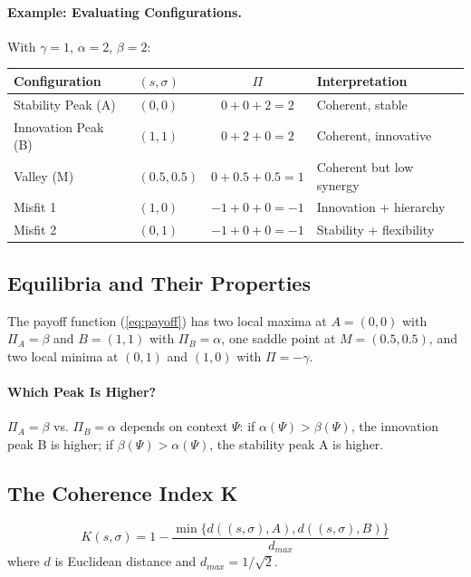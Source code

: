 \paragraph{Example: Evaluating Configurations.}
With $\gamma = 1$, $\alpha = 2$, $\beta = 2$:
\begin{center}
\renewcommand{\arraystretch}{1.2}
\begin{tabular}{llcl}
\hline
\textbf{Configuration} & $(s, \sigma)$ & $\Pi$ & \textbf{Interpretation} \\
\hline
Stability Peak (A) & $(0, 0)$ & $0 + 0 + 2 = 2$ & Coherent, stable \\
Innovation Peak (B) & $(1, 1)$ & $0 + 2 + 0 = 2$ & Coherent, innovative \\
Valley (M) & $(0.5, 0.5)$ & $0 + 0.5 + 0.5 = 1$ & Coherent but low synergy \\
Misfit 1 & $(1, 0)$ & $-1 + 0 + 0 = -1$ & Innovation + hierarchy \\
Misfit 2 & $(0, 1)$ & $-1 + 0 + 0 = -1$ & Stability + flexibility \\
\hline
\end{tabular}
\end{center}

\subsection{Equilibria and Their Properties}

\begin{proposition}
The payoff function (\ref{eq:payoff}) has two local maxima at $A = (0, 0)$ with $\Pi_A = \beta$
and $B = (1, 1)$ with $\Pi_B = \alpha$, one saddle point at $M = (0.5, 0.5)$,
and two local minima at $(0, 1)$ and $(1, 0)$ with $\Pi = -\gamma$.
\end{proposition}

\paragraph{Which Peak Is Higher?}
$\Pi_A = \beta$ vs. $\Pi_B = \alpha$ depends on context $\Psi$:
if $\alpha(\Psi) > \beta(\Psi)$, the innovation peak B is higher;
if $\beta(\Psi) > \alpha(\Psi)$, the stability peak A is higher.

\subsection{The Coherence Index K}

\begin{definition}
\begin{equation}
  K(s, \sigma) = 1 - \frac{\min\{d((s,\sigma), A), d((s,\sigma), B)\}}{d_{max}}
  \label{eq:kformal}
\end{equation}
where $d$ is Euclidean distance and $d_{max} = 1/\sqrt{2}$.
\end{definition}

